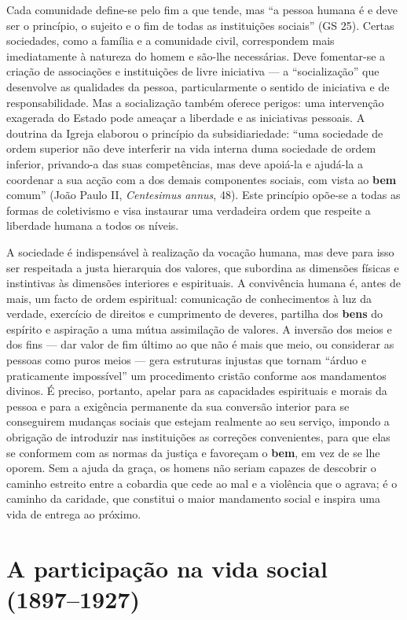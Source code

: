 Cada comunidade define-se pelo fim a que tende, mas ``a pessoa humana é e deve ser o princípio, o sujeito e o fim de todas as instituições sociais'' (GS 25). Certas sociedades, como a família e a comunidade civil, correspondem mais imediatamente à natureza do homem e são-lhe necessárias. Deve fomentar-se a criação de associações e instituições de livre iniciativa --- a ``socialização'' que desenvolve as qualidades da pessoa, particularmente o sentido de iniciativa e de responsabilidade. Mas a socialização também oferece perigos: uma intervenção exagerada do Estado pode ameaçar a liberdade e as iniciativas pessoais. A doutrina da Igreja elaborou o princípio da subsidiariedade: ``uma sociedade de ordem superior não deve interferir na vida interna duma sociedade de ordem inferior, privando-a das suas competências, mas deve apoiá-la e ajudá-la a coordenar a sua acção com a dos demais componentes sociais, com vista ao \textbf{bem} comum'' (João Paulo II, \textit{Centesimus annus}, 48). Este princípio opõe-se a todas as formas de coletivismo e visa instaurar uma verdadeira ordem que respeite a liberdade humana a todos os níveis.

A sociedade é indispensável à realização da vocação humana, mas deve para isso ser respeitada a justa hierarquia dos valores, que subordina as dimensões físicas e instintivas às dimensões interiores e espirituais. A convivência humana é, antes de mais, um facto de ordem espiritual: comunicação de conhecimentos à luz da verdade, exercício de direitos e cumprimento de deveres, partilha dos \textbf{bens} do espírito e aspiração a uma mútua assimilação de valores. A inversão dos meios e dos fins --- dar valor de fim último ao que não é mais que meio, ou considerar as pessoas como puros meios --- gera estruturas injustas que tornam ``árduo e praticamente impossível'' um procedimento cristão conforme aos mandamentos divinos. É preciso, portanto, apelar para as capacidades espirituais e morais da pessoa e para a exigência permanente da sua conversão interior para se conseguirem mudanças sociais que estejam realmente ao seu serviço, impondo a obrigação de introduzir nas instituições as correções convenientes, para que elas se conformem com as normas da justiça e favoreçam o \textbf{bem}, em vez de se lhe oporem. Sem a ajuda da graça, os homens não seriam capazes de descobrir o caminho estreito entre a cobardia que cede ao mal e a violência que o agrava; é o caminho da caridade, que constitui o maior mandamento social e inspira uma vida de entrega ao próximo.

\section{A participação na vida social (1897--1927)}

